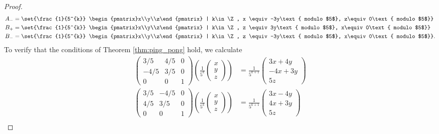 \begin{proof}
\begin{align*}
    A_{-} &= \set{\frac{1}{5^{k}} \begin{pmatrix}x\\y\\z\end{pmatrix} | k\in \Z, x \equiv -3y\text{ modulo $5$}, z\equiv 0\text{ modulo $5$}}\\
    B_{+} &= \set{\frac{1}{5^{k}} \begin{pmatrix}x\\y\\z\end{pmatrix} | k\in \Z, z \equiv 3y\text{ modulo $5$}, x\equiv 0\text{ modulo $5$}}\\
    B_{-} &= \set{\frac{1}{5^{k}} \begin{pmatrix}x\\y\\z\end{pmatrix} | k\in \Z, z \equiv -3y\text{ modulo $5$}, x\equiv 0\text{ modulo $5$}}.
  \end{align*}
  To verify that the conditions of Theorem \ref{thm:ping_pong} hold, we calculate
  \begin{align*}
    \begin{pmatrix}3/5 & 4/5 & 0 \\ -4/5 & 3/5 & 0 \\ 0 & 0 & 1\end{pmatrix}\left(\frac{1}{5^k} \begin{pmatrix}x\\y\\z\end{pmatrix}\right) &= \frac{1}{5^{k+1}} \begin{pmatrix}3x + 4y \\ -4x + 3y \\ 5z\end{pmatrix}\tag*{(1)}\\
    \begin{pmatrix}3/5 & -4/5 & 0 \\ 4/5 & 3/5 & 0 \\ 0 & 0 & 1\end{pmatrix} \left(\frac{1}{5^k} \begin{pmatrix}x\\y\\z\end{pmatrix}\right) &= \frac{1}{5^{k+1}} \begin{pmatrix}3x - 4y \\ 4x + 3y \\ 5z\end{pmatrix}\tag*{(2)}\\

\end{align*}
\end{proof}
